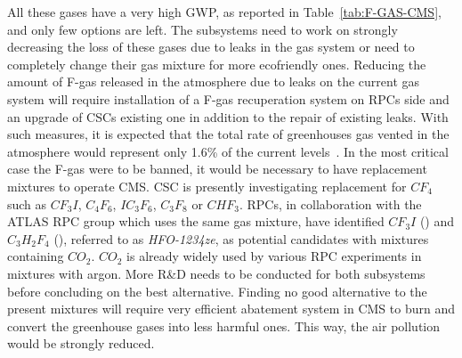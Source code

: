 	All these gases have a very high GWP, as reported in Table~\ref{tab:F-GAS-CMS}, and only few options are left. The subsystems need to work on strongly decreasing the loss of these gases due to leaks in the gas system or need to completely change their gas mixture for more ecofriendly ones. Reducing the amount of F-gas released in the atmosphere due to leaks on the current gas system will require installation of a F-gas recuperation system on RPCs side and an upgrade of CSCs existing one in addition to the repair of existing leaks. With such measures, it is expected that the total rate of greenhouses gas vented in the atmosphere would represent only 1.6\% of the current levels~\cite{PHASEIITP}. In the most critical case the F-gas were to be banned, it would be necessary to have replacement mixtures to operate CMS. CSC is presently investigating replacement for $CF_4$ such as $CF_3I$, $C_4F_6$, $IC_3F_6$, $C_3F_8$ or $CHF_3$. RPCs, in collaboration with the ATLAS RPC group which uses the same gas mixture, have identified $CF_3I$ () and $C_3H_2F_4$ (), referred to as \textit{HFO-1234ze}, as potential candidates with mixtures containing $CO_2$. $CO_2$ is already widely used by various RPC experiments in mixtures with argon. More R\&D needs to be conducted for both subsystems before concluding on the best alternative. Finding no good alternative to the present mixtures will require very efficient abatement system in CMS to burn and convert the greenhouse gases into less harmful ones. This way, the air pollution would be strongly reduced.
	

